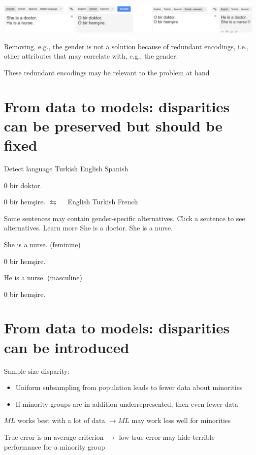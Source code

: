 \documentclass[10pt]{article}
\begin{document}
\begin{center}
\includegraphics[max width=\textwidth]{2024_01_08_7c1a383b1e6170f910e4g-13}
\end{center}

Removing, e.g., the gender is not a solution because of redundant encodings, i.e., other attributes that may correlate with, e.g., the gender.

These redundant encodings may be relevant to the problem at hand

\section*{From data to models: disparities can be preserved but should be fixed}
Detect language Turkish English Spanish

0 bir doktor.

0 bir hemşire. $\leftrightarrows \quad$ English Turkish French

Some sentences may contain gender-specific alternatives. Click a sentence to see alternatives.
Learn more
She is a doctor.
She is a nurse.

She is a nurse. (feminine)

0 bir hemşire.

He is a nurse. (masculine)

0 bir hemşire.

\section*{From data to models: disparities can be introduced}
Sample size disparity:

\begin{itemize}
  \item Uniform subsampling from population leads to fewer data about minorities

  \item If minority groups are in addition underrepresented, then even fewer data

\end{itemize}

$M L$ works best with a lot of data $\rightarrow M L$ may work less well for minorities

True error is an average criterion $\rightarrow$ low true error may hide terrible performance for a minority group
\end{document}
